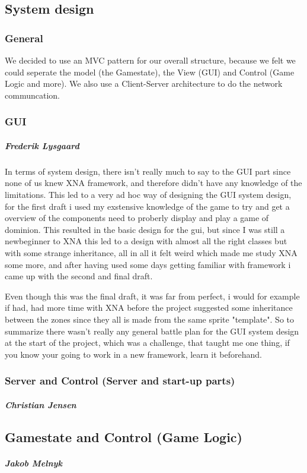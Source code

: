 \subsection{System design}
\subsubsection{General}
We decided to use an MVC pattern for our overall structure, because we felt we could seperate the model (the Gamestate), the View (GUI) and Control (Game Logic and more). We also use a Client-Server architecture to do the network communcation.

\subsubsection{GUI}
\subparagraph{Frederik Lysgaard}
In terms of system design, there isn't really much to say to the GUI part since none of us knew XNA framework, and therefore didn't have any knowledge of the limitations.
 This led to a very ad hoc way of designing the GUI system design, for the first draft i used my exstensive knowledge of the game to try and get a overview of the components need to proberly display and play a game of dominion. 
This resulted in the basic design for the gui, but since I was still a newbeginner to XNA this led to a design with almost all the right classes but with some strange inheritance, all in all it felt weird which made me study XNA some more, and after having used some days getting familiar with framework i came up with the second and final draft.

Even though this was the final draft, it was far from perfect, i would for example if had, had more time with XNA before the project suggested some inheritance between the zones since they all is made from the same sprite "template". So to summarize there wasn't really any general battle plan for the GUI system design at the start of the project, which was a challenge, that taught me one thing,
if you know your going to work in a new framework, learn it beforehand.
  
\subsubsection{Server and Control (Server and start-up parts)}
\subparagraph{Christian Jensen}

\subsection{Gamestate and Control (Game Logic)}
\subparagraph{Jakob Melnyk}
